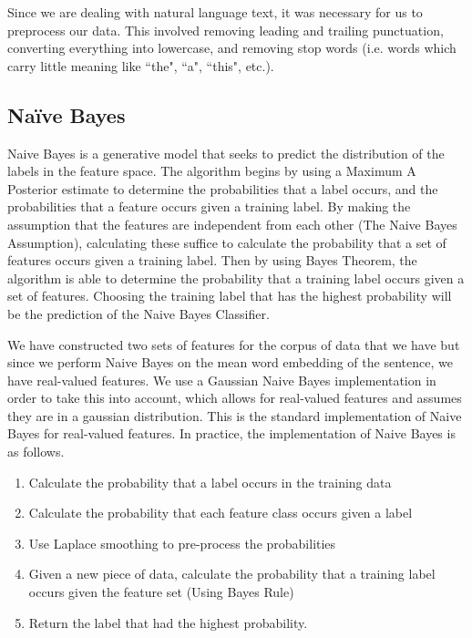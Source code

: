 \documentclass{article}
\begin{document}
Since we are dealing with natural language text, it was necessary for us to preprocess
our data. This involved removing leading and trailing punctuation, converting everything
into lowercase, and removing stop words (i.e. words which carry little meaning like
``the", ``a", ``this", etc.).

\subsection{Na\"ive Bayes}
\label{nb}
Naive Bayes is a generative model that seeks to predict the distribution of the labels in the feature space. The algorithm begins by using a Maximum A Posterior estimate to determine the probabilities that a label occurs, and the probabilities that a feature occurs given a training label. By making the assumption that the features are independent from each other (The Naive Bayes Assumption), calculating these suffice to calculate the probability that a set of features occurs given a training label. Then by using Bayes Theorem, the algorithm is able to determine the probability that a training label occurs given a set of features. Choosing the training label that has the highest probability will be the prediction of the Naive Bayes Classifier. 

We have constructed two sets of features for the corpus of data that we have but since we perform Naive Bayes on the mean word embedding of the sentence, we have real-valued features. We use a Gaussian Naive Bayes implementation in order to take this into account, which allows for real-valued features and assumes they are in a gaussian distribution. This is the standard implementation of Naive Bayes for real-valued features. In practice, the implementation of Naive Bayes is as follows.


\begin{enumerate}
    \item Calculate the probability that a label occurs in the training data
    \item Calculate the probability that each feature class occurs given a label
    \item Use Laplace smoothing to pre-process the probabilities
    \item Given a new piece of data, calculate the probability that a training label occurs given the feature set (Using Bayes Rule)
    \item Return the label that had the highest probability. 
\end{enumerate}
\end{document}
